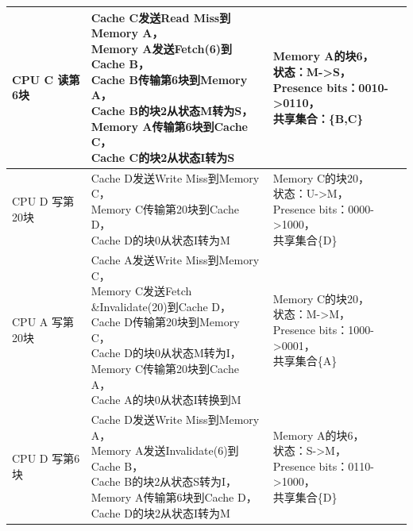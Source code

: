 \documentclass{ctexart}
\makeatletter
\newcommand{\tabincell}[2]{\begin{tabular}{@{}#1@{}}#2\end{tabular}}
\makeatother
\begin{document}
\begin{enumerate}
\begin{longtable}{|l|l|l|}
        CPU C 读第6块  & \tabincell{l}{Cache C发送Read Miss到Memory A，\\Memory A发送Fetch(6)到Cache B，\\Cache B传输第6块到Memory A，\\Cache B的块2从状态M转为S，\\Memory A传输第6块到Cache C，\\Cache C的块2从状态I转为S}                   & \tabincell{l}{Memory A的块6，\\状态：M-\textgreater{}S，\\Presence bits：0010-\textgreater{}0110，\\共享集合：\{B,C\}}                                                                                  \\ \hline
        CPU D 写第20块 & \tabincell{l}{Cache D发送Write Miss到Memory C，\\Memory C传输第20块到Cache D，\\Cache D的块0从状态I转为M}                                                                                    & \tabincell{l}{Memory C的块20，\\状态：U-\textgreater{}M，\\Presence bits：0000-\textgreater{}1000，\\共享集合\{D\}}                                                                                    \\ \hline
        CPU A 写第20块 & \tabincell{l}{Cache A发送Write Miss到Memory C，\\Memory C发送Fetch\\\&Invalidate(20)到Cache D，\\Cache D传输第20块到Memory C，\\Cache D的块0从状态M转为I，\\Memory C传输第20块到Cache A，\\Cache A的块0从状态I转换到M}  & \tabincell{l}{Memory C的块20，\\状态：M-\textgreater{}M，\\Presence bits：1000-\textgreater{}0001，\\共享集合\{A\}}                                                                                    \\ \hline
        CPU D 写第6块  & \tabincell{l}{Cache D发送Write Miss到Memory A，\\Memory A发送Invalidate(6)到Cache B，\\Cache B的块2从状态S转为I，\\Memory A传输第6块到Cache D，\\Cache D的块2从状态I转为M}                                   & \tabincell{l}{Memory A的块6，\\状态：S-\textgreater{}M，\\Presence bits：0110-\textgreater{}1000，\\共享集合\{D\}}                                                                                     \\ \hline

\end{longtable}
\end{enumerate}
\end{document}
